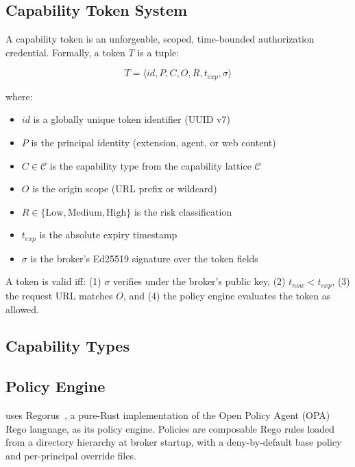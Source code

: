 \subsection{Capability Token System}

A capability token is an unforgeable, scoped, time-bounded
authorization credential.
Formally, a token $T$ is a tuple:

\[
T = \langle id, P, C, O, R, t_{exp}, \sigma \rangle
\]

where:
\begin{itemize}
  \item $id$ is a globally unique token identifier (UUID v7)
  \item $P$ is the principal identity (extension, agent, or web content)
  \item $C \in \mathcal{C}$ is the capability type from the
    capability lattice $\mathcal{C}$
  \item $O$ is the origin scope (URL prefix or wildcard)
  \item $R \in \{\text{Low}, \text{Medium}, \text{High}\}$
    is the risk classification
  \item $t_{exp}$ is the absolute expiry timestamp
  \item $\sigma$ is the broker's Ed25519 signature over the
    token fields
\end{itemize}

A token is valid iff: (1) $\sigma$ verifies under the broker's
public key, (2) $t_{now} < t_{exp}$, (3) the request URL
matches $O$, and (4) the policy engine evaluates the token
as allowed.

\subsection{Capability Types}
\label{subsec:capability_types}


\subsection{Policy Engine}

\ferrite{} uses Regorus~\cite{regorus}, a pure-Rust implementation
of the Open Policy Agent (OPA) Rego language, as its policy engine.
Policies are composable Rego rules loaded from a directory hierarchy
at broker startup, with a deny-by-default base policy and per-principal
override files.

